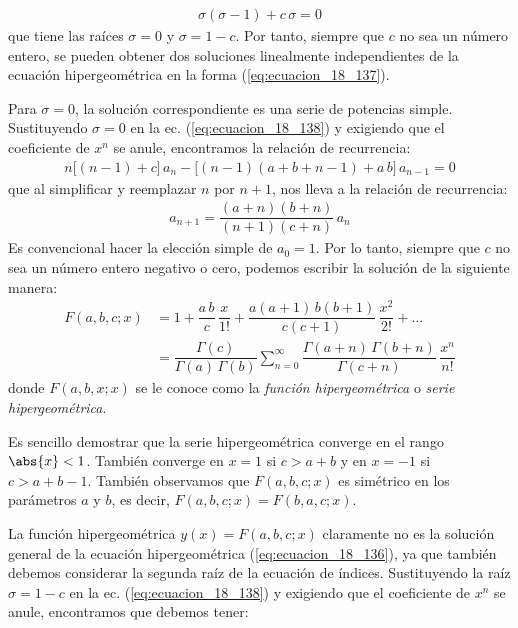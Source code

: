 \begin{align*}
\sigma (\sigma - 1) + c \, \sigma = 0
\end{align*}
que tiene las raíces $\sigma = 0$ y $\sigma = 1 - c$. Por tanto, siempre que $c$ no sea un número entero, se pueden obtener dos soluciones linealmente independientes de la ecuación hipergeométrica en la forma (\ref{eq:ecuacion_18_137}).
\par
Para $\sigma = 0$, la solución correspondiente es una serie de potencias simple. Sustituyendo $\sigma = 0$ en la ec. (\ref{eq:ecuacion_18_138}) y exigiendo que el coeficiente de $x^{n}$ se anule, encontramos la relación de recurrencia:
\begin{align}
n \big[ (n - 1) + c \big] \, a_{n} - \big[ (n - 1)(a + b + n - 1) + a \, b \big] \, a_{n-1} = 0
\label{eq:ecuacion_18_139}
\end{align}
que al simplificar y reemplazar $n$ por $n + 1$, nos lleva a la relación de recurrencia:
\begin{align}
a_{n+1} = \dfrac{(a + n)(b + n)}{(n + 1)(c + n)} \, a_{n}
\label{eq:ecuacion_18_140}
\end{align}
Es convencional hacer la elección simple de $a_{0} = 1$. Por lo tanto, siempre que $c$ no sea un número entero negativo o cero, podemos escribir la solución de la siguiente manera:
\begin{align}
F(a, b, c; x) &= 1 + \dfrac{a \, b}{c} \, \dfrac{x}{1!} +  \dfrac{a (a + 1)\, b (b + 1)}{c (c + 1)} \, \dfrac{x^{2}}{2!} + \ldots \label{eq:ecuacion_18_141} \\[0.5em]
&= \dfrac{\Gamma (c)}{\Gamma (a) \, \Gamma (b)} \sum_{n=0}^{\infty} \dfrac{\Gamma (a + n) \, \Gamma (b + n)}{\Gamma (c + n)} \, \dfrac{x^{n}}{n!} \label{eq:ecuacion_18_142}
\end{align}
donde $F(a, b, x; x)$ se le conoce como la \emph{función hipergeométrica} o \emph{serie hipergeométrica}.
\par
Es sencillo demostrar que la serie hipergeométrica converge en el rango $\abs{x} < 1$. También converge en $x = 1$ si $ c > a + b$ y en $x = -1$ si $c > a + b - 1$. También observamos que $F (a, b, c; x)$ es simétrico en los parámetros $a$ y $b$, es decir, $F (a, b, c; x) = F (b, a, c; x)$.
\par
La función hipergeométrica $y (x) = F (a, b, c; x)$ claramente no es la solución general de la ecuación hipergeométrica (\ref{eq:ecuacion_18_136}), ya que también debemos considerar la segunda raíz de la ecuación de índices. Sustituyendo la raíz $\sigma = 1 - c$ en la ec.  (\ref{eq:ecuacion_18_138}) y exigiendo que el coeficiente de $x^{n}$ se anule, encontramos que debemos tener:
